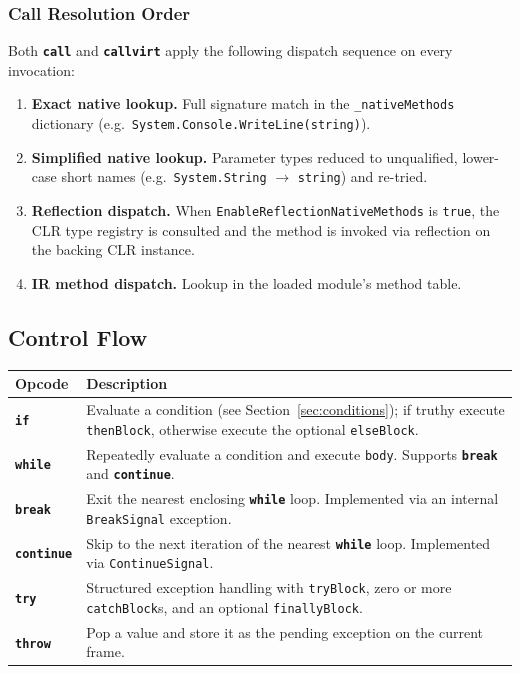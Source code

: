\documentclass[11pt,a4paper]{article}
\newcommand{\code}[1]{\texttt{\small #1}}
\newcommand{\typename}[1]{\textcolor{typecolor}{\texttt{\small #1}}}
\newcommand{\opcode}[1]{\textbf{\texttt{#1}}}
\begin{document}
\subsubsection{Call Resolution Order}

Both \opcode{call} and \opcode{callvirt} apply the following dispatch
sequence on every invocation:

\begin{enumerate}[leftmargin=2em]
  \item \textbf{Exact native lookup.} Full signature match in the
    \code{\_nativeMethods} dictionary (e.g.\
    \code{System.Console.WriteLine(string)}).
  \item \textbf{Simplified native lookup.} Parameter types reduced to
    unqualified, lower-case short names (e.g.\
    \code{System.String} $\to$ \code{string}) and re-tried.
  \item \textbf{Reflection dispatch.} When
    \code{EnableReflectionNativeMethods} is \texttt{true}, the CLR type
    registry is consulted and the method is invoked via reflection on the
    backing CLR instance.
  \item \textbf{IR method dispatch.} Lookup in the loaded module's method
    table.
\end{enumerate}

\subsection{Control Flow}

\begin{longtable}{lp{10cm}}
  \toprule
  \textbf{Opcode}   & \textbf{Description} \\
  \midrule
  \endhead
  \opcode{if}       & Evaluate a condition (see Section~\ref{sec:conditions}); if
                      truthy execute \code{thenBlock}, otherwise execute the optional
                      \code{elseBlock}. \\
  \opcode{while}    & Repeatedly evaluate a condition and execute \code{body}.
                      Supports \opcode{break} and \opcode{continue}. \\
  \opcode{break}    & Exit the nearest enclosing \opcode{while} loop. Implemented
                      via an internal \typename{BreakSignal} exception. \\
  \opcode{continue} & Skip to the next iteration of the nearest \opcode{while}
                      loop. Implemented via \typename{ContinueSignal}. \\
  \opcode{try}      & Structured exception handling with \code{tryBlock}, zero or
                      more \code{catchBlock}s, and an optional
                      \code{finallyBlock}. \\
  \opcode{throw}    & Pop a value and store it as the pending exception on the
                      current frame. \\
  \bottomrule
\end{longtable}
\end{document}
